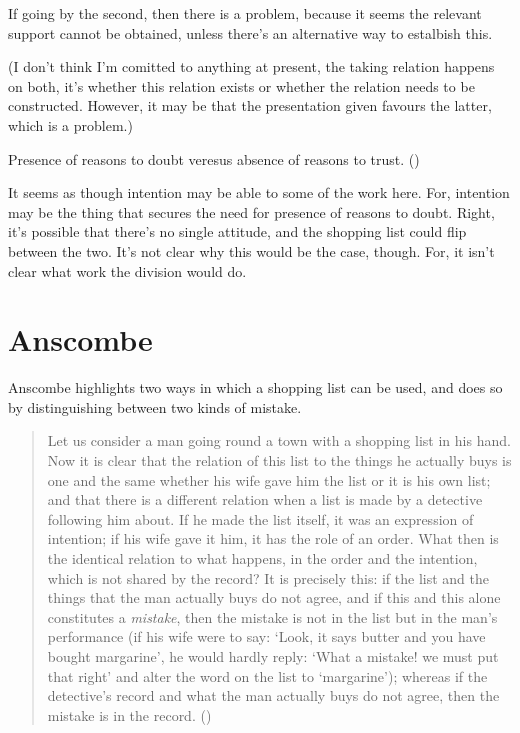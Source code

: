 \documentclass[10pt]{article}
\begin{document}
If going by the second, then there is a problem, because it seems the relevant support cannot be obtained, unless there's an alternative way to estalbish this.

(I don't think I'm comitted to anything at present, the taking relation happens on both, it's whether this relation exists or whether the relation needs to be constructed.
However, it may be that the presentation given favours the latter, which is a problem.)

Presence of reasons to doubt veresus absence of reasons to trust. (\cite[703]{Weatherson:2015aa})

It seems as though intention may be able to some of the work here.
For, intention may be the thing that secures the need for presence of reasons to doubt.
Right, it's possible that there's no single attitude, and the shopping list could flip between the two.
It's not clear why this would be the case, though.
For, it isn't clear what work the division would do.



\newpage

\section{Anscombe}
\label{sec:anscombe}

Anscombe highlights two ways in which a shopping list can be used, and does so by distinguishing between two kinds of mistake.

\begin{quote}
  Let us consider a man going round a town with a shopping list in his hand.
  Now it is clear that the relation of this list to the things he actually buys is one and the same whether his wife gave him the list or it is his own list; and that there is a different relation when a list is made by a detective following him about.
  If he made the list itself, it was an expression of intention; if his wife gave it him, it has the role of an order.
  What then is the identical relation to what happens, in the order and the intention, which is not shared by the record?
  It is precisely this:
  if the list and the things that the man actually buys do not agree, and if this and this alone constitutes a \emph{mistake}, then the mistake is not in the list but in the man's performance (if his wife were to say: `Look, it says butter and you have bought margarine', he would hardly reply: `What a mistake! we must put that right' and alter the word on the list to `margarine'); whereas if the detective’s record and what the man actually buys do not agree, then the mistake is in the record.\nolinebreak
  \mbox{}\hfill\mbox(\citeyear[56]{Anscombe:1957aa})
\end{quote}
\end{document}
